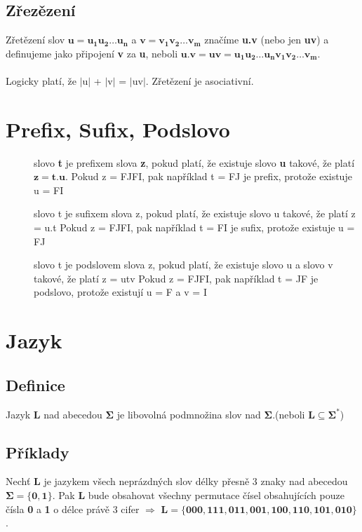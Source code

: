 \documentclass{report}
\begin{document}
\subsection*{Zřezězení}
Zřetězení slov $\mathbf{u = u_1u_2…u_{n}}$ a $\mathbf{v = v_1v_2…v_{m}}$ značíme \textbf{u.v} (nebo jen \textbf{uv}) a definujeme jako připojení \textbf{v} za \textbf{u}, 
neboli $\mathbf{u.v = uv = u_1u_2…u_n v_1v_2…v_m}$.
\\ \\  Logicky platí, že $\mid$u$\mid$  +  $\mid$v$\mid$ = $\mid$uv$\mid$.
Zřetězení je asociativní.


\section{Prefix, Sufix, Podslovo}

\begin{description}

    \item[] slovo \textbf{t} je prefixem slova \textbf{z}, pokud platí, že existuje slovo \textbf{u} takové, že platí $\mathbf{z = t.u}$. Pokud z = FJFI, pak například t = FJ je prefix, protože existuje u = FI
    \item[] slovo t je sufixem slova z, pokud platí, že existuje slovo u takové, že platí z = u.t Pokud z = FJFI, pak například t = FI je sufix, protože existuje u = FJ
    \item[] slovo t je podslovem slova z, pokud platí, že existuje slovo u a slovo v takové, že platí z = utv
Pokud z = FJFI, pak například t = JF je podslovo, protože existují u = F a v = I

\end{description}

\section{Jazyk}

\subsection*{Definice}
Jazyk \textbf{L} nad abecedou $\mathbf{\Sigma}$ je libovolná podmnožina slov nad $\mathbf{\Sigma}$.(neboli $\mathbf{L \subseteq \Sigma^*}$)
\subsection*{Příklady}
Nechť \textbf{L} je jazykem všech neprázdných slov délky přesně 3 znaky nad abecedou $\mathbf{\Sigma = \{0,1\}}$. Pak \textbf{L} bude obsahovat všechny permutace čísel obsahujících pouze čísla \textbf{0} a \textbf{1} o délce právě 3 cifer $\Rightarrow$ $\mathbf{L=\{000,111,011,001,100,110,101,010\}}$.
\pagebreak
\end{document}
